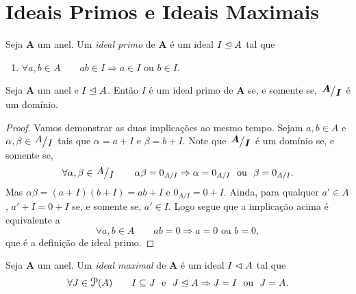 \section{Ideais Primos e Ideais Maximais}

\begin{defi}
	Seja $\bm A$ um anel. Um \emph{ideal primo} de $\bm A$ é um ideal $I \mathrel{\unlhd} A$ tal que
	\begin{enumerate}
	\item $\forall a,b \in A \qquad ab \in I \Rightarrow a \in I \text{\ \ ou\ \ } b \in I$.
	\end{enumerate}
\end{defi}

\begin{teo}
\label{teo:ide.prim.dom}
	Seja $\bm A$ um anel e $I \mathrel{\unlhd} A$. Então $I$ é um ideal primo de $\bm A$ se, e somente se, $\bm{\quo{A}{I}}$ é um domínio.
\end{teo}
\begin{proof}
	Vamos demonstrar as duas implicações ao mesmo tempo. Sejam $a,b \in A$ e $\alpha,\beta \in \quo{A}{I}$ tais que $\alpha=a+I$ e $\beta=b+I$. Note que $\bm{\quo{A}{I}}$ é um domínio se, e somente se,
	\begin{equation*}
	\forall \alpha,\beta \in \quo{A}{I} \qquad \alpha\beta=0_{A/I} \Rightarrow \alpha=0_{A/I} \text{\ \ ou\ \ } \beta=0_{A/I}.
	\end{equation*}
Mas $\alpha\beta=(a+I)(b+I)=ab+I$ e $0_{A/I}=0+I$. Ainda, para qualquer $a' \in A$, $a'+I=0+I$ se, e somente se, $a' \in I$. Logo segue que a implicação acima é equivalente a
	\begin{equation*}
	\forall a,b \in A \qquad ab=0 \Rightarrow a=0 \text{\ \ ou\ \ } b=0,
	\end{equation*}
que é a definição de ideal primo.
\end{proof}

\begin{defi}
	Seja $\bm A$ um anel. Um \emph{ideal maximal} de $\bm A$ é um ideal $I \mathrel{\lhd} A$ tal que
	\begin{equation*}
	\forall J \in \p(A) \qquad I \subseteq J \e J \ide A \Rightarrow J = I \ou J = A.
	\end{equation*}
\end{defi}

